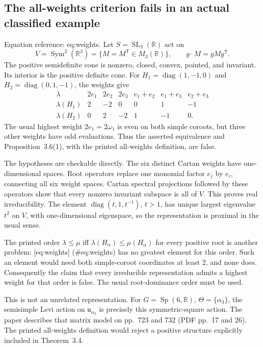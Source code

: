 \documentclass[10pt]{article}
\begin{document}
\subsection*{The all-weights criterion fails in an actual classified example}
Equation reference: eq:weights. Let \(S=\operatorname{SL}_3(\mathbb R)\) act on \[V=\operatorname{Sym}^2(\mathbb R^3)=\{M=M^{\mathsf T}\in M_3(\mathbb R)\},\qquad g\cdot M=gMg^{\mathsf T}.\] The positive semidefinite cone is nonzero, closed, convex, pointed, and invariant. Its interior is the positive definite cone. For \(H_1=\operatorname{diag}(1,-1,0)\) and \(H_2=\operatorname{diag}(0,1,-1)\), the weights give \[
\begin{array}{c|rrrrrr}
\lambda&2e_1&2e_2&2e_3&e_1+e_2&e_1+e_3&e_2+e_3\\ \hline
\lambda(H_1)&2&-2&0&0&1&-1\\
\lambda(H_2)&0&2&-2&1&-1&0 .
\end{array}\] The usual highest weight \(2e_1=2\omega_1\) is even on both simple coroots, but three other weights have odd evaluations. Thus the asserted equivalence and Proposition 3.6(1), with the printed all-weights definition, are false.\par
The hypotheses are checkable directly. The six distinct Cartan weights have one-dimensional spaces. Root operators replace one monomial factor \(e_j\) by \(e_i\), connecting all six weight spaces. Cartan spectral projections followed by these operators show that every nonzero invariant subspace is all of \(V\). This proves real irreducibility. The element \(\operatorname{diag}(t,1,t^{-1})\), \(t>1\), has unique largest eigenvalue \(t^2\) on \(V\), with one-dimensional eigenspace, so the representation is proximal in the usual sense.\par
The printed order \(\lambda\leq\mu\) iff \(\lambda(H_\alpha)\leq\mu(H_\alpha)\) for every positive root is another problem: [eq:weights] (\#eq:weights) has no greatest element for this order. Such an element would need both simple-coroot coordinates at least \(2\), and none does. Consequently the claim that every irreducible representation admits a highest weight for that order is false. The usual root-dominance order must be used.\par
This is not an unrelated representation. For \(G=\operatorname{Sp}(6,\mathbb R)\), \(\Theta=\{\alpha_3\}\), the semisimple Levi action on \(\mathfrak u_{\alpha_3}\) is precisely this symmetric-square action. The paper describes that matrix model on pp. 723 and 732 (PDF pp. 17 and 26). The printed all-weights definition would reject a positive structure explicitly included in Theorem 3.4.\par
\end{document}
